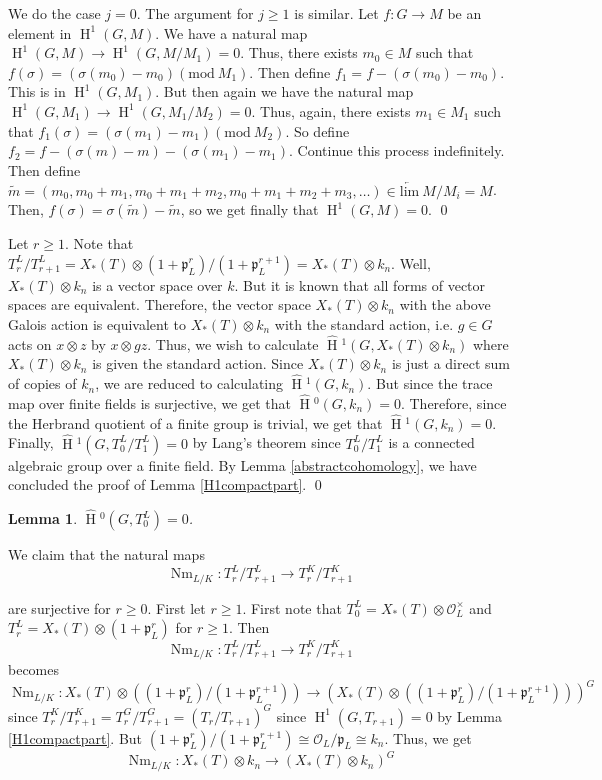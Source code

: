 \documentclass[11pt]{amsart}
\theoremstyle{plain}
\newtheorem{lemma}[theorem]{Lemma}
\newcommand{\HT}[1]{\hat{\HH}{}^{#1}}
\theoremstyle{definition}
\DeclareMathOperator{\HH}{H}
\DeclareMathOperator{\Nm}{Nm}
\begin{document}
\proof

We do the case $j = 0$.  The argument for $j \geq 1$ is similar.  Let
$f : G \rightarrow M$ be an element in $\HH^1(G,M)$.  We have a natural
map $\HH^1(G, M ) \rightarrow \HH^1(G, M / M_1) = 0$.  Thus, there exists
$m_0 \in M$ such that $f(\sigma) = (\sigma(m_0) - m_0) (\mathrm{mod} \
M_1)$.  Then define $f_1 = f - (\sigma(m_0) - m_0)$.  This is in
$\HH^1(G, M_1)$. But then again we have the natural map
$\HH^1(G, M_1) \rightarrow \HH^1(G, M_1 / M_2) = 0$.  Thus, again, there
exists $m_1 \in M_1$ such that $f_1(\sigma) = (\sigma(m_1) - m_1) (\mathrm{mod} \ M_2)$.
So define $f_2 = f - (\sigma(m) - m) - (\sigma(m_1) - m_1)$.  Continue
this process indefinitely.  Then define
$\tilde{m} = (m_0, m_0 + m_1, m_0 + m_1 + m_2, m_0 + m_1 + m_2
+ m_3, \ldots) \in \underleftarrow{\mathrm{lim}} \ M / M_i = M$.  Then,
$f(\sigma) = \sigma(\tilde{m}) - \tilde{m}$, so we get finally that
$\HH^1(G,M) = 0$.  \qed

Let $r \geq 1$.  Note that $T_r^L / T_{r+1}^L = X_*(T) \otimes (1 +
\mathfrak{p}_L^r) / (1 + \mathfrak{p}_L^{r+1}) = X_*(T) \otimes
k_n$.  Well, $X_*(T) \otimes k_n$ is a vector space
over $k$.  But it is known that all forms of vector spaces
are equivalent.  Therefore, the vector space $X_*(T) \otimes
k_n$ with the above Galois action is equivalent to $X_*(T)
\otimes k_n$ with the standard action, i.e. $g \in G$ acts
on $x \otimes z$ by $x \otimes gz$.  Thus, we wish to calculate
$\HT{1}(G, X_*(T) \otimes k_n)$ where $X_*(T) \otimes
k_n$ is given the standard action.  Since $X_*(T) \otimes
k_n$ is just a direct sum of copies of $k_n$, we
are reduced to calculating $\HT{1}(G, k_n)$.  But since
the trace map over finite fields is surjective, we get that
$\HT{0}(G, k_n) = 0$.  Therefore, since the Herbrand
quotient of a finite group is trivial, we get that $\HT{1}(G,
k_n) = 0$.  Finally, $\HT{1}(G, T_0^L / T_1^L) = 0$ by
Lang's theorem since $T_0^L / T_1^L$ is a connected algebraic group
over a finite field.  By Lemma \ref{abstractcohomology}, we have
concluded the proof of Lemma \ref{H1compactpart}.  \qed

\begin{lemma}\label{H0compactpart}
$\HT{0}(G,T_0^L) = 0$.
\end{lemma}

\proof
We claim that the natural maps
$$\Nm_{L/K} : T_r^L / T_{r+1}^L \rightarrow T_r^K / T_{r+1}^K$$

are surjective for $r \geq 0$.  First let $r \geq 1$.  First note that
$T_0^L = X_*(T) \otimes \mathcal{O}_L^\times$ and
$T_r^L = X_*(T) \otimes (1 + \mathfrak{p}_L^r)$ for $r \geq 1$.  Then
$$\Nm_{L/K} : T_r^L / T_{r+1}^L \rightarrow T_r^K / T_{r+1}^K$$
becomes
$$\Nm_{L/K} : X_*(T) \otimes \left( (1 + \mathfrak{p}_L^r) / (1 +
  \mathfrak{p}_L^{r+1}) \right) \rightarrow (X_*(T) \otimes \left( (1 +
  \mathfrak{p}_L^r) / (1 + \mathfrak{p}_L^{r+1}) \right) )^G$$
since $T_r^K / T_{r+1}^K = T_r^G / T_{r+1}^G = (T_r / T_{r+1})^G$ since
$\HH^1(G, T_{r+1}) = 0$ by Lemma \ref{H1compactpart}.  But
$(1 + \mathfrak{p}_L^r) / (1 + \mathfrak{p}_L^{r+1}) \cong \mathcal{O}_L / \mathfrak{p}_L \cong k_n$.
Thus, we get
$$\Nm_{L/K} : X_*(T) \otimes k_n \rightarrow (X_*(T) \otimes k_n)^G$$
\end{document}
